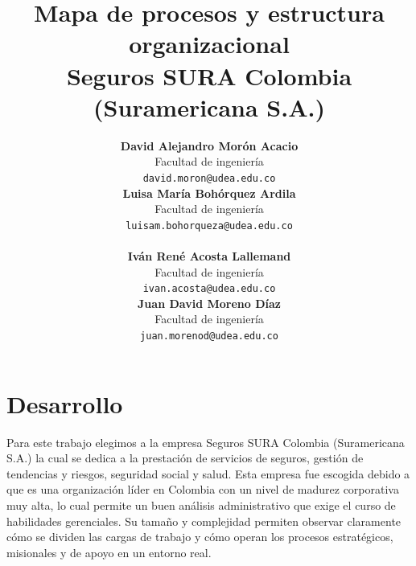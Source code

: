 \documentclass[onecolumn]{article} %
\begin{document}
	
	\title{
		\textbf{Mapa de procesos y estructura organizacional}\\ \textbf{Seguros SURA Colombia (Suramericana S.A.)}
		}
		
	
	\author{
		\centering
		\begin{minipage}{0.45\textwidth}
			\centering
			\textbf{David Alejandro Morón Acacio}\\
			Facultad de ingeniería\\
			\texttt{david.moron@udea.edu.co}\\
			\vspace{10pt}  
			\textbf{Luisa María Bohórquez Ardila}\\
			Facultad de ingeniería\\
			\texttt{luisam.bohorqueza@udea.edu.co}\\
		\end{minipage}%
		\hfill
		\begin{minipage}{0.45\textwidth}
			\centering
			\textbf{Iván René Acosta Lallemand}\\
			Facultad de ingeniería\\
			\texttt{ivan.acosta@udea.edu.co}\\
			\vspace{10pt}
			\textbf{Juan David Moreno Díaz}\\
			Facultad de ingeniería\\
			\texttt{juan.morenod@udea.edu.co}
		\end{minipage}
	}
	
	\date{} %
	
	\maketitle
	
	\thispagestyle{firstpage}
	
	\section{Desarrollo}
	
	Para este trabajo elegimos a la empresa Seguros SURA Colombia (Suramericana S.A.) la cual se dedica a la prestación de servicios de seguros, gestión de tendencias y riesgos, seguridad social y salud. Esta empresa fue escogida debido a que es una organización líder en Colombia con un nivel de madurez corporativa muy alta, lo cual permite un buen análisis administrativo que exige el curso de habilidades gerenciales. Su tamaño y complejidad permiten observar claramente cómo se dividen las cargas de trabajo y cómo operan los procesos estratégicos, misionales y de apoyo en un entorno real.\\
	
\end{document}
